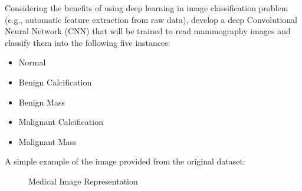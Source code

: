 \documentclass{book}
\begin{document}
        Considering the benefits of using deep learning in image classification problem (e.g., automatic feature extraction from raw data), develop a deep Convolutional Neural Network (CNN) that will be trained to read mammography images and classify them into the following five instances:

        \begin{itemize}
            \item Normal
            \item Benign Calcification
            \item Benign Mass
            \item Malignant Calcification
            \item Malignant Mass
        \end{itemize}

        A simple example of the image provided from the original dataset:

        \begin{figure}[h]
            \hfill
            \hfill
            \hfill
            \hfill
            \caption{Medical Image Representation}
        \end{figure}
         
\end{document}
